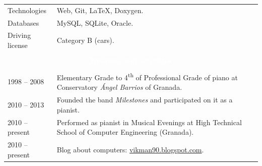 \documentclass[12pt,a4paper]{article}
\newcommand{\header}[1]{\multicolumn{2}{c}{\cellcolor{black} \textcolor{white} {#1}} \\}
\begin{document}
\begin{longtable}{p{}p{}}
		Technologies & Web, Git, LaTeX, Doxygen. \\
		Databases & MySQL, SQLite, Oracle. \\
		Driving license & Category B (cars). \\
		\\
		\header{\textbf{Interests and activities}}
		\\
		1998 -- 2008 & Elementary Grade to 4\textsuperscript{th} of Professional
		Grade of piano at Conservatory \textit{Ángel Barrios} of Granada. \\
		2010 -- 2013 & Founded the band \textit{Milestones} and participated on
		it as a pianist. \\
		2010 -- present & Performed as pianist in Musical Evenings at High
		Technical School of Computer Engineering (Granada). \\
		2010 -- present & Blog about computers: 
		\href{http://vikman90.blogspot.com}{vikman90.blogspot.com}. \\
	\end{longtable}
\end{document}
